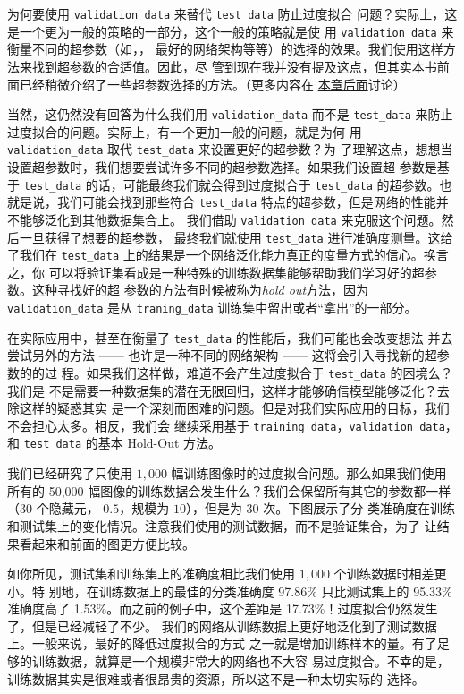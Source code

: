 \label{validation_explanation}
为何要使用 \lstinline!validation_data! 来替代 \lstinline!test_data! 防止过度拟合
问题？实际上，这是一个更为一般的策略的一部分，这个一般的策略就是使
用 \lstinline!validation_data! 来衡量不同的超参数（如\epochs{}，\learningrate{}，
最好的网络架构等等）的选择的效果。我们使用这样方法来找到超参数的合适值。因此，尽
管到现在我并没有提及这点，但其实本书前面已经稍微介绍了一些超参数选择的方法。（更多内容在%
\hyperref[sec:how_to_choose_a_neural_network's_hyper-parameters]{本章后面}讨论）

当然，这仍然没有回答为什么我们用 \lstinline!validation_data! 而不是
\lstinline!test_data! 来防止过度拟合的问题。实际上，有一个更加一般的问题，就是为何
用 \lstinline!validation_data! 取代 \lstinline!test_data! 来设置更好的超参数？为
了理解这点，想想当设置超参数时，我们想要尝试许多不同的超参数选择。如果我们设置超
参数是基于 \lstinline!test_data! 的话，可能最终我们就会得到过度拟合于
\lstinline!test_data!  的超参数。也就是说，我们可能会找到那些符合
\lstinline!test_data! 特点的超参数，但是网络的性能并不能够泛化到其他数据集合上。
我们借助 \lstinline!validation_data! 来克服这个问题。然后一旦获得了想要的超参数，
最终我们就使用 \lstinline!test_data! 进行准确度测量。这给了我们在
\lstinline!test_data! 上的结果是一个网络泛化能力真正的度量方式的信心。换言之，你
可以将验证集看成是一种特殊的训练数据集能够帮助我们学习好的超参数。这种寻找好的超
参数的方法有时候被称为\emph{hold out}方法，因为 \lstinline!validation_data! 是从
\lstinline!traning_data! 训练集中留出或者``拿出''的一部分。

在实际应用中，甚至在衡量了 \lstinline!test_data! 的性能后，我们可能也会改变想法
并去尝试另外的方法 —— 也许是一种不同的网络架构 —— 这将会引入寻找新的超参数的的过
程。如果我们这样做，难道不会产生过度拟合于 \lstinline!test_data! 的困境么？我们是
不是需要一种数据集的潜在无限回归，这样才能够确信模型能够泛化？去除这样的疑惑其实
是一个深刻而困难的问题。但是对我们实际应用的目标，我们不会担心太多。相反，我们会
继续采用基于 \lstinline!training_data!，\lstinline!validation_data!，和
\lstinline!test_data! 的基本 Hold-Out 方法。

我们已经研究了只使用 $1,000$ 幅训练图像时的过度拟合问题。那么如果我们使用所有的
50,000 幅图像的训练数据会发生什么？我们会保留所有其它的参数都一样（$30$ 个隐藏元，
  \learningrate{} $0.5$，\minibatch{}规模为 $10$），但是\epochs{}为 30 次。下图展示了分
类准确度在训练和测试集上的变化情况。注意我们使用的测试数据，而不是验证集合，为了
让结果看起来和前面的图更方便比较。

如你所见，测试集和训练集上的准确度相比我们使用 $1,000$ 个训练数据时相差更小。特
别地，在训练数据上的最佳的分类准确度 97.86\% 只比测试集上的 95.33\% 准确度高了
1.53\%。而之前的例子中，这个差距是 17.73\%！过度拟合仍然发生了，但是已经减轻了不少。
我们的网络从训练数据上更好地泛化到了测试数据上。一般来说，最好的降低过度拟合的方式
之一就是增加训练样本的量。有了足够的训练数据，就算是一个规模非常大的网络也不大容
易过度拟合。不幸的是，训练数据其实是很难或者很昂贵的资源，所以这不是一种太切实际的
选择。


